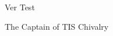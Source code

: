 \documentclass[blue]{guildcamp4}
\begin{document}
\name{\bVer{}}

Ver Test

\begin{members}
	\member{\cVone{}} The Captain of TIS Chivalry


\end{members}
\end{document}

